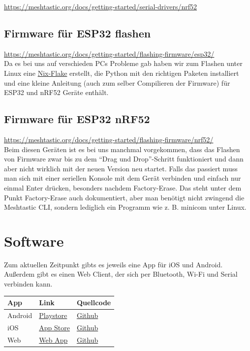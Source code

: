\documentclass[12pt,a4paper]{article}
\begin{document}
\url{https://meshtastic.org/docs/getting-started/serial-drivers/nrf52}

\subsection{Firmware für ESP32 flashen}
\url{https://meshtastic.org/docs/getting-started/flashing-firmware/esp32/}
\\
Da es bei uns auf verschieden PCs Probleme gab haben wir zum Flashen unter Linux eine \href{https://github.com/go3ranh/meshtastic-flasher}{Nix-Flake} erstellt,
die Python mit den richtigen Paketen installiert und eine kleine Anleitung (auch zum selber Compilieren der Firmware)
für ESP32 und nRF52 Geräte enthält.\\

\subsection{Firmware für ESP32 nRF52}
\url{https://meshtastic.org/docs/getting-started/flashing-firmware/nrf52/}
\\
Beim diesen Geräten ist es bei uns manchmal vorgekommen, dass das Flashen von Firmware zwar bis zu dem “Drag und Drop”-Schritt funktioniert und dann aber nicht wirklich mit der neuen Version neu startet. Falls das passiert muss man sich mit einer seriellen Konsole mit dem Gerät verbinden und einfach nur einmal Enter drücken, besonders nachdem Factory-Erase. Das steht unter dem Punkt Factory-Erase auch dokumentiert, aber man benötigt nicht zwingend die Meshtastic CLI, sondern lediglich ein Programm wie z. B. minicom unter Linux.

\section{Software}

Zum aktuellen Zeitpunkt gibts es jeweils eine App für iOS und Android. Außerdem gibt es einen Web Client,
der sich per Bluetooth, Wi-Fi und Serial verbinden kann.\\

\begin{tabular}[h]{l | l | l}
App & Link & Quellcode \\

\hline
Android  & \href{https://play.google.com/store/apps/details?id=com.geeksville.mesh}{Playstore} & \href{https://github.com/meshtastic/Meshtastic-Android}{Github} \\
\hline
iOS & \href{https://apps.apple.com/us/app/meshtastic/id1586432531}{App Store} & \href{https://github.com/meshtastic/Meshtastic-Apple}{Github}  \\
\hline
Web & \href{https://client.meshtastic.org/}{Web App} & \href{https://github.com/meshtastic/web}{Github} \\
\end{tabular}\\
\\
\end{document}
